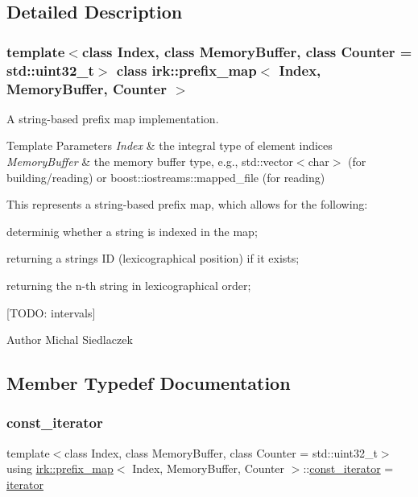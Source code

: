 \subsection{Detailed Description}
\subsubsection*{template$<$class Index, class Memory\+Buffer, class Counter = std\+::uint32\+\_\+t$>$\newline
class irk\+::prefix\+\_\+map$<$ Index, Memory\+Buffer, Counter $>$}

A string-\/based prefix map implementation. 


\begin{DoxyTemplParams}{Template Parameters}
{\em Index} & the integral type of element indices \\
\hline
{\em Memory\+Buffer} & the memory buffer type, e.\+g., {\ttfamily std\+::vector$<$char$>$} (for building/reading) or {\ttfamily boost\+::iostreams\+::mapped\+\_\+file} (for reading)\\
\hline
\end{DoxyTemplParams}
This represents a string-\/based prefix map, which allows for the following\+:
\begin{DoxyItemize}
\item determinig whether a string is indexed in the map;
\item returning a string\textquotesingle{}s ID (lexicographical position) if it exists;
\item returning the n-\/th string in lexicographical order;
\item \mbox{[}T\+O\+DO\+: intervals\mbox{]}
\end{DoxyItemize}

\begin{DoxyAuthor}{Author}
Michal Siedlaczek 
\end{DoxyAuthor}


\subsection{Member Typedef Documentation}
\mbox{\label{classirk_1_1prefix__map_abe4f68e5fc9c0d72e34b87f108e653ed}} 
\subsubsection{\texorpdfstring{const\+\_\+iterator}{const\_iterator}}
{\footnotesize\ttfamily template$<$class Index, class Memory\+Buffer, class Counter = std\+::uint32\+\_\+t$>$ \\
using \mbox{\hyperlink{classirk_1_1prefix__map}{irk\+::prefix\+\_\+map}}$<$ Index, Memory\+Buffer, Counter $>$\+::\mbox{\hyperlink{classirk_1_1prefix__map_abe4f68e5fc9c0d72e34b87f108e653ed}{const\+\_\+iterator}} =  \mbox{\hyperlink{classirk_1_1prefix__map_1_1iterator}{iterator}}}



